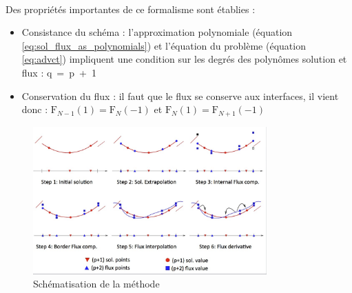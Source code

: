         \paragraph{}
        Des propriétés importantes de ce formalisme sont établies : 
        \begin{itemize}[label=\textbullet]
            \item Consistance du schéma : l'approximation polynomiale (équation \ref{eq:sol_flux_as_polynomials}) et l'équation du problème (équation \ref{eq:advct}) impliquent une condition sur les degrés des polynômes solution et flux : q~=~p~+~1
            \item Conservation du flux : il faut que le flux se conserve aux interfaces, il vient donc : $\mathrm{F}_{N-1}(1)=\mathrm{F}_{N}(-1)$ et $\mathrm{F}_{N}(1)=\mathrm{F}_{N+1}(-1)$
        \end{itemize}
        \begin{figure}
            \centering
            \includegraphics[width=0.8\textwidth]{images/methode_spectrale.jpg}
            \caption{Schématisation de la méthode} 
            \label{fig:meth_spectrale}
        \end{figure}

